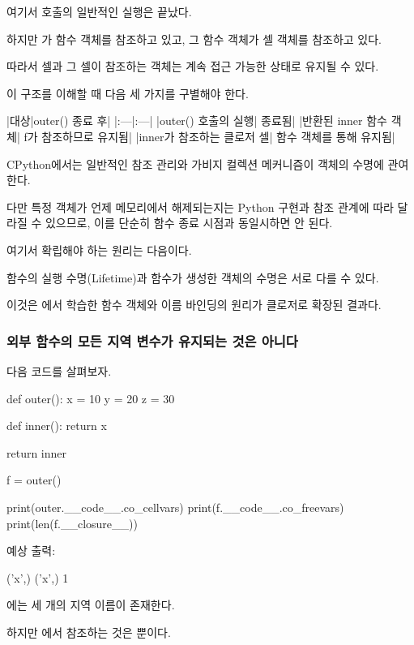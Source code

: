 여기서  호출의 일반적인 실행은 끝났다.

하지만 가  함수 객체를 참조하고 있고, 그 함수 객체가 셀 객체를 참조하고 있다.

따라서 셀과 그 셀이 참조하는 객체는 계속 접근 가능한 상태로 유지될 수 있다.

이 구조를 이해할 때 다음 세 가지를 구별해야 한다.

\begin{dhktable}
|대상|outer() 종료 후|
|:---|:---|
|outer() 호출의 실행|	종료됨|
|반환된 inner 함수 객체|	f가 참조하므로 유지됨|
|inner가 참조하는 클로저 셀|	함수 객체를 통해 유지됨|
\end{dhktable}

CPython에서는 일반적인 참조 관리와 가비지 컬렉션 메커니즘이 객체의 수명에 관여한다.

다만 특정 객체가 언제 메모리에서 해제되는지는 Python 구현과 참조 관계에 따라 달라질 수 있으므로, 이를 단순히 함수 종료 시점과 동일시하면 안 된다.

여기서 확립해야 하는 원리는 다음이다.

함수의 실행 수명(Lifetime)과 함수가 생성한 객체의 수명은 서로 다를 수 있다.

이것은 에서 학습한 함수 객체와 이름 바인딩의 원리가 클로저로 확장된 결과다.

\subsubsection{외부 함수의 모든 지역 변수가 유지되는 것은 아니다}

다음 코드를 살펴보자.

\begin{dhkcode}
def outer():
    x = 10
    y = 20
    z = 30

    def inner():
        return x

    return inner


f = outer()

print(outer.__code__.co_cellvars)
print(f.__code__.co_freevars)
print(len(f.__closure__))
\end{dhkcode}

예상 출력:

\begin{dhkzsh}
('x',)
('x',)
1
\end{dhkzsh}

에는 세 개의 지역 이름이 존재한다.

하지만 에서 참조하는 것은 뿐이다.

